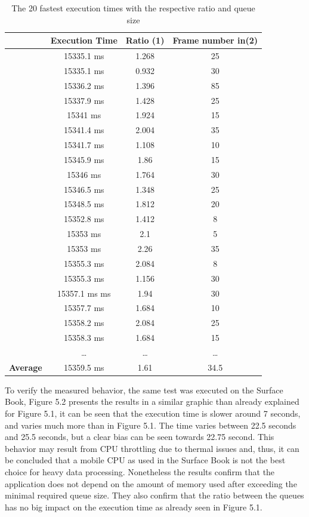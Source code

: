 \begin{table}[!]
\centering
	\begin{tabular}{l|c|c|c}
	  \hline
	  	&\textbf{Execution Time} & \textbf{Ratio (1)} & \textbf{Frame number in(2)}\\\hline 
	  	& 15335.1 ms & 1.268 & 25\\
		& 15335.1 ms & 0.932 & 30\\
		& 15336.2 ms & 1.396 & 85\\
		& 15337.9 ms & 1.428 & 25\\
		& 15341 ms  & 1.924 & 15\\
		& 15341.4  ms & 2.004 & 35\\
		& 15341.7  ms & 1.108 & 10\\
		& 15345.9  ms & 1.86 & 15\\
		& 15346 ms & 1.764 & 30\\
		& 15346.5  ms& 1.348 & 25\\
		& 15348.5  ms& 1.812 & 20\\
		& 15352.8  ms& 1.412 & 8\\
		& 15353 ms  & 2.1	 & 5\\
		& 15353 ms  & 2.26 & 35\\
		& 15355.3 ms & 2.084 & 8\\
		& 15355.3 ms & 1.156 & 30\\
		& 15357.1 ms  ms& 1.94 & 30\\
		& 15357.7 ms & 1.684 & 10\\
		& 15358.2 ms & 2.084 & 25\\
		& 15358.3 ms & 1.684 & 15\\
		& \dots & \dots & \dots\\\hline
	  	\textbf{Average} & 15359.5 ms& 1.61 & 34.5\\ 
	  \hline
	\end{tabular}
	\caption{The 20 fastest execution times with the respective ratio and queue size}
\end{table}

To verify the measured behavior, the same test was executed on the Surface Book, Figure 5.2 presents the results in a similar graphic than already explained for Figure 5.1, it can be seen that the execution time is slower around 7 seconds, and varies much more than in Figure 5.1. The time varies between 22.5 seconds and 25.5 seconds, but a clear bias can be seen towards 22.75 second. This behavior may result from CPU throttling due to thermal issues and, thus, it can be concluded that a mobile CPU as used in the Surface Book is not the best choice for heavy data processing. Nonetheless the results confirm that the application does not depend on the amount of memory used after exceeding the minimal required queue size. They also confirm that the ratio between the queues has no big impact on the execution time as already seen in Figure 5.1. 
\vspace{1em}

